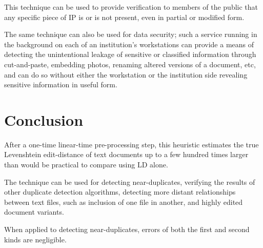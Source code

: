 \documentclass[html]{article}    %
\begin{document}
\begin{itemize}
{  		This technique can be used to provide verification to members of the public that any specific piece of IP is or is not present, 
		even in partial or modified form.
  		
  		The same technique can also be used for data security; such a service running in the background on each of an institution's workstations can provide a
  		means of detecting the unintentional leakage of sensitive or classified information through cut-and-paste, embedding photos, renaming altered
  		versions of a document, etc, and can do so without either the workstation or the institution side revealing sensitive information in useful form. 
  	}
\end{itemize}

\section{Conclusion}
After a one-time linear-time pre-processing step, this heuristic estimates the true Levenshtein edit-distance of text documents up to a few hundred times
larger than would be practical to compare using LD alone.

The technique can be used for detecting near-duplicates, verifying the results of other duplicate detection algorithms, detecting more 
distant relationships between text files, such as inclusion of one file in another, and highly edited document variants.

When applied to detecting near-duplicates, errors of both the first and second kinds are negligible.

% 
%
% 
\end{document}
